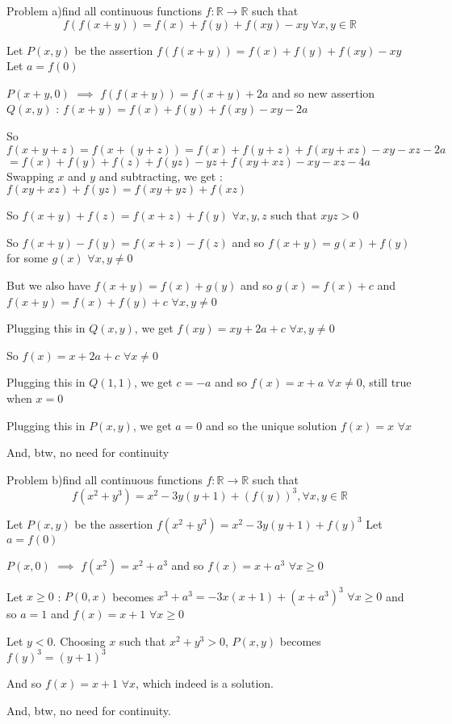 \begin{solution}
	\begin{tcolorbox}Problem 
a)find all continuous functions $f:\mathbb{R}\to\mathbb{R}$ such that
\[f(f(x+y))=f(x)+f(y)+f(xy)-xy\;\forall x,y\in\mathbb{R}\]
\end{tcolorbox}
Let $P(x,y)$ be the assertion $f(f(x+y))=f(x)+f(y)+f(xy)-xy$
Let $a=f(0)$

$P(x+y,0)$ $\implies$ $f(f(x+y))=f(x+y)+2a$ and so new assertion $Q(x,y)$ : $f(x+y)=f(x)+f(y)+f(xy)-xy-2a$

So $f(x+y+z)=f(x+(y+z))=f(x)+f(y+z)+f(xy+xz)-xy-xz-2a$ $=f(x)+f(y)+f(z)+f(yz)-yz+f(xy+xz)-xy-xz-4a$
Swapping $x$ and $y$ and subtracting, we get : $f(xy+xz)+f(yz)=f(xy+yz)+f(xz)$

So $f(x+y)+f(z)=f(x+z)+f(y)$ $\forall x,y,z$ such that $xyz>0$

So $f(x+y)-f(y)=f(x+z)-f(z)$ and so $f(x+y)=g(x)+f(y)$ for some $g(x)$ $\forall x,y\ne 0$

But we also have $f(x+y)=f(x)+g(y)$ and so $g(x)=f(x)+c$ and $f(x+y)=f(x)+f(y)+c$ $\forall x,y\ne 0$

Plugging this in $Q(x,y)$, we get $f(xy)=xy+2a+c$ $\forall x,y\ne 0$

So $f(x)=x+2a+c$ $\forall x\ne 0$

Plugging this in $Q(1,1)$, we get $c=-a$ and so $f(x)=x+a$ $\forall x\ne 0$, still true when $x=0$

Plugging this in $P(x,y)$, we get $a=0$ and so the unique solution $\boxed{f(x)=x}$ $\forall x$

And, btw, no need for continuity
\end{solution}



\begin{solution}
	\begin{tcolorbox}Problem 
b)find all continuous functions $f:\mathbb{R}\to\mathbb{R}$ such that
\[f(x^2 +y^3)= x^2 - 3y(y+1) + (f(y))^3,\forall x,y\in\mathbb{R}\]\end{tcolorbox}
Let $P(x,y)$ be the assertion $f(x^2+y^3)=x^2-3y(y+1)+f(y)^3$
Let $a=f(0)$

$P(x,0)$ $\implies$ $f(x^2)=x^2+a^3$ and so $f(x)=x+a^3$ $\forall x\ge 0$

Let $x\ge 0$ : $P(0,x)$ becomes $x^3+a^3=-3x(x+1)+(x+a^3)^3$ $\forall x\ge 0$ and so $a=1$ and $f(x)=x+1$ $\forall x\ge 0$

Let $y<0$. Choosing $x$ such that $x^2+y^3>0$, $P(x,y)$ becomes $f(y)^3=(y+1)^3$

And so $\boxed{f(x)=x+1}$ $\forall x$, which indeed is a solution.

And, btw, no need for continuity.
\end{solution}



